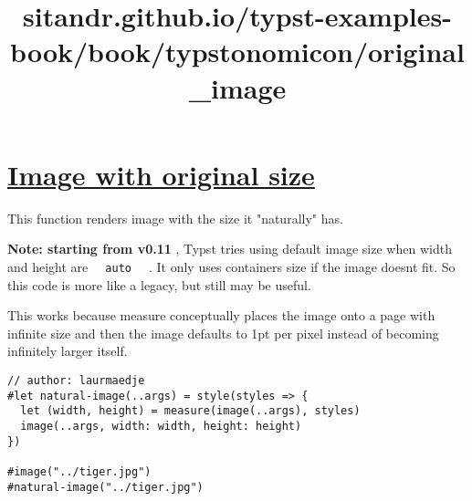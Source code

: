 \title{sitandr.github.io/typst-examples-book/book/typstonomicon/original_image}

\section{\texorpdfstring{\hyperref[image-with-original-size]{Image with
original
size}}{Image with original size}}\label{image-with-original-size}

This function renders image with the size it "naturally" has.

\textbf{Note: starting from v0.11} , Typst tries using default image
size when width and height are \texttt{\ }{\texttt{\ auto\ }}\texttt{\ }
. It only uses container\textquotesingle s size if the image
doesn\textquotesingle t fit. So this code is more like a legacy, but
still may be useful.

This works because measure conceptually places the image onto a page
with infinite size and then the image defaults to 1pt per pixel instead
of becoming infinitely larger itself.

\begin{verbatim}
// author: laurmaedje
#let natural-image(..args) = style(styles => {
  let (width, height) = measure(image(..args), styles)
  image(..args, width: width, height: height)
})

#image("../tiger.jpg")
#natural-image("../tiger.jpg")
\end{verbatim}

\pandocbounded{}
